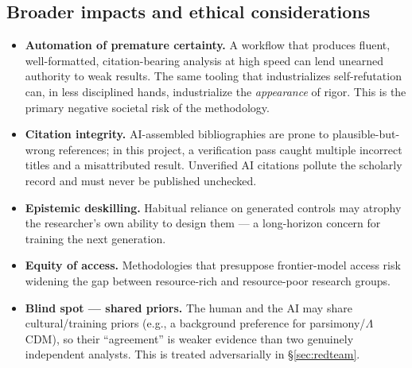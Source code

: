 \documentclass[11pt]{article}
\newcommand{\LCDM}{$\Lambda$CDM}
\begin{document}
\subsection{Broader impacts and ethical considerations}
\begin{itemize}[leftmargin=1.4em,itemsep=2pt]
\item \textbf{Automation of premature certainty.} A workflow that produces fluent, well-formatted, citation-bearing analysis at high speed can lend unearned authority to weak results. The same tooling that industrializes self-refutation can, in less disciplined hands, industrialize the \emph{appearance} of rigor. This is the primary negative societal risk of the methodology.
\item \textbf{Citation integrity.} AI-assembled bibliographies are prone to plausible-but-wrong references; in this project, a verification pass caught multiple incorrect titles and a misattributed result. Unverified AI citations pollute the scholarly record and must never be published unchecked.
\item \textbf{Epistemic deskilling.} Habitual reliance on generated controls may atrophy the researcher's own ability to design them --- a long-horizon concern for training the next generation.
\item \textbf{Equity of access.} Methodologies that presuppose frontier-model access risk widening the gap between resource-rich and resource-poor research groups.
\item \textbf{Blind spot --- shared priors.} The human and the AI may share cultural/training priors (e.g., a background preference for parsimony/\LCDM), so their ``agreement'' is weaker evidence than two genuinely independent analysts. This is treated adversarially in \S\ref{sec:redteam}.
\end{itemize}
\end{document}
